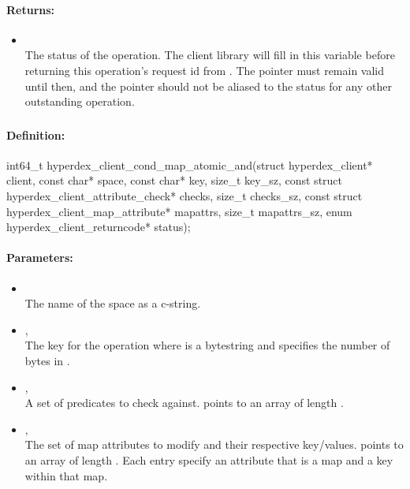 \paragraph{Returns:}
\begin{itemize}[noitemsep]
\item {}\\
The status of the operation.  The client library will fill in this variable before returning this operation's request id from .  The pointer must remain valid until then, and the pointer should not be aliased to the status for any other outstanding operation.
\end{itemize}

\pagebreak
\subsubsection{}
\label{api:c:cond_map_atomic_and}


\paragraph{Definition:}
\begin{ccode}
int64_t hyperdex_client_cond_map_atomic_and(struct hyperdex_client* client,
        const char* space,
        const char* key, size_t key_sz,
        const struct hyperdex_client_attribute_check* checks, size_t checks_sz,
        const struct hyperdex_client_map_attribute* mapattrs, size_t mapattrs_sz,
        enum hyperdex_client_returncode* status);
\end{ccode}

\paragraph{Parameters:}
\begin{itemize}[noitemsep]
\item {}\\
The name of the space as a c-string.
\item {}, \\
The key for the operation where  is a bytestring and  specifies the number of bytes in .
\item {}, \\
A set of predicates to check against.   points to an array of length .
\item {}, \\
The set of map attributes to modify and their respective key/values.   points to an array of length .  Each entry specify an attribute that is a map and a key within that map.
\end{itemize}

